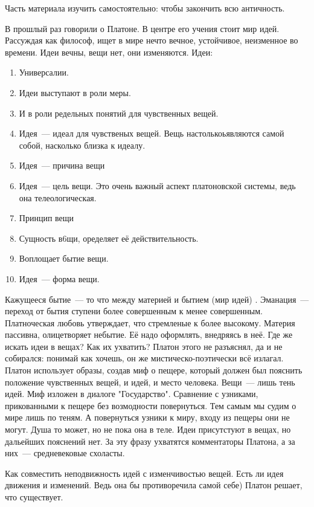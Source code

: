 
Часть материала изучить самостоятельно: чтобы закончить всю античность. 

В прошлый раз говорили о Платоне. В центре его учения стоит мир идей. Рассуждая как философ, ищет в мире нечто вечное, устойчивое, неизменное во времени. 
Идеи вечны, вещи нет, они изменяются. 
Идеи:

\begin{enumerate}
	\item Универсалии. 
	\item Идеи выступают в роли меры. 
	\item И в роли редельных понятий для чувственных вещей. 
	\item Идея~--- идеал для чувственых вещей. Вещь настолькоьявляются самой собой, насколько близка к идеалу. 
	\item Идея~--- причина вещи
	\item Идея~--- цель вещи. Это очень важный аспект платоновской системы, ведь она телеологическая. 
	\item Принцип вещи
	\item Сущность в6щи, оределяет её действительность. 
	\item Воплощает бытие вещи. 
	\item Идея~--- форма вещи. 
\end{enumerate}

Кажущееся бытие~--- то что между материей и бытием (мир идей) . 
Эманация~--- переход от бытия ступени более совершенным к менее совершенным. 
Платноческая любовь утверждает, что стремленые к более высокому. 
Материя пассивна, олицетворяет небытие. Её надо оформлять, внедряясь в неё. 
Где же искать идеи в вещах? Как их ухватить?
Платон этого не разъяснял, да и не собирался: понимай как хочешь, он же мистическо-поэтически всё излагал. Платон использует образы, создав миф о пещере, который должен был пояснить положение чувственных вещей, и идей, и место человека. 
Вещи~--- лишь тень идей. Миф изложен в диалоге "Государство". Сравнение с узниками, прикованными к пещере без возмодности повернуться. Тем самым мы судим о мире лишь по теням. 
А повернуться узники к миру, входу из пещеры они не могут. Душа то может, но не пока она в теле. 
Идеи присутстуют в вещах, но дальейших пояснений нет. За эту фразу ухватятся комментаторы Платона, а за них~--- средневековые схоласты. 

Как совместить неподвижность идей с изменчивостью вещей. Есть ли идея движения и изменений. Ведь она бы противоречила самой себе) Платон решает, что существует. 

